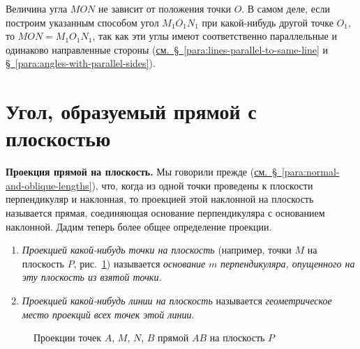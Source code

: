Величина угла \(MON\) не зависит от положения точки \(O\). В самом деле, если построим указанным способом угол \(M_1O_1N_1\) при какой-нибудь другой точке \(O_1\), то \(MON=M_1O_1N_1\), так как эти углы имеют соответственно параллельные и одинаково направленные стороны (\hyperref[para:lines-parallel-to-same-line]{см.~§~\ref*{para:lines-parallel-to-same-line}} и \hyperref[para:angles-with-parallel-sides]{§~\ref*{para:angles-with-parallel-sides}}).

\section*{Угол, образуемый прямой с плоскостью}

 \textbf{Проекция прямой на плоскость.} Мы говорили прежде (\hyperref[para:normal-and-oblique-lengths]{см.~§~\ref*{para:normal-and-oblique-lengths}}), что, когда из одной точки проведены к плоскости перпендикуляр и наклонная, то проекцией этой наклонной на плоскость называется прямая, соединяющая основание
перпендикуляра с основанием наклонной. Дадим теперь более общее определение проекции.

\begin{enumerate}[label=\arabic*),ref=\arabic*]
    \item \emph{Проекцией какой-нибудь точки на плоскость} (например, точки \(M\) на плоскость \(P\), рис.~\ref{fig:kiselev-stereo-341}) называется \emph{основание} \(m\) \emph{перпендикуляра, опущенного на эту плоскость из взятой точки}.
    \item \emph{Проекцией какой-нибудь линии на плоскость} называется \emph{геометрическое место проекций всех точек этой линии}.
\end{enumerate}

\begin{figure}[htbp]
    \centering
    \renewcommand{\thefigure}{341}
    \captionsetup{name=Рис.,labelsep=period}
    
    \caption{Проекции точек \(A\), \(M\), \(N\), \(B\) прямой \(AB\) на плоскость \(P\)}\label{fig:kiselev-stereo-341}
\end{figure}

